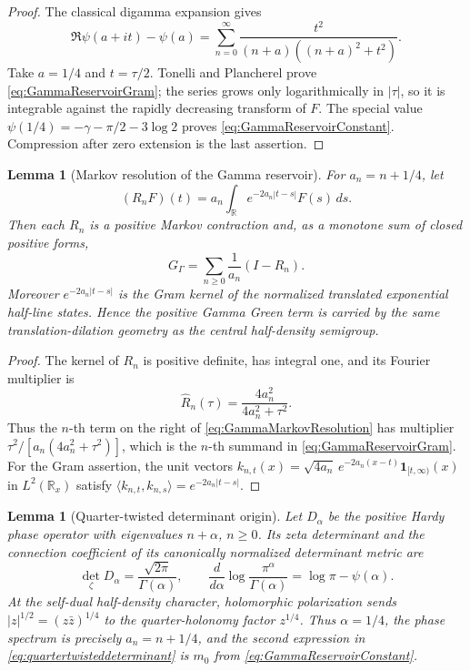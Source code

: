 \documentclass[11pt]{amsart}
\newtheorem{lemma}[theorem]{Lemma}
\theoremstyle{definition}
\theoremstyle{remark}
\begin{document}
\begin{proof}
The classical digamma expansion gives
\[
 \Re\psi(a+it)-\psi(a)
 =\sum_{n=0}^\infty
 \frac{t^2}{(n+a)((n+a)^2+t^2)}.
\]
Take $a=1/4$ and $t=\tau/2$.  Tonelli and Plancherel prove
\eqref{eq:GammaReservoirGram}; the series grows only logarithmically in
$|\tau|$, so it is integrable against the rapidly decreasing transform of
$F$.  The special value
$\psi(1/4)=-\gamma-\pi/2-3\log2$ proves
\eqref{eq:GammaReservoirConstant}.  Compression after zero extension is the
last assertion.
\end{proof}

\begin{lemma}[Markov resolution of the Gamma reservoir]
\label{lem:GammaMarkovResolution}
For $a_n=n+1/4$, let
\[
 (R_nF)(t)=a_n\int_{\mathbb R}e^{-2a_n|t-s|}F(s)\,ds.
\]
Then each $R_n$ is a positive Markov contraction and, as a monotone sum of
closed positive forms,
\begin{equation}\label{eq:GammaMarkovResolution}
 G_\Gamma=\sum_{n\ge0}\frac1{a_n}(I-R_n).
\end{equation}
Moreover $e^{-2a_n|t-s|}$ is the Gram kernel of the normalized translated
exponential half-line states.  Hence the positive Gamma Green term is carried
by the same translation-dilation geometry as the central half-density
semigroup.
\end{lemma}

\begin{proof}
The kernel of $R_n$ is positive definite, has integral one, and its Fourier
multiplier is
\[
 \widehat R_n(\tau)=\frac{4a_n^2}{4a_n^2+\tau^2}.
\]
Thus the $n$-th term on the right of
\eqref{eq:GammaMarkovResolution} has multiplier
\(\tau^2/[a_n(4a_n^2+\tau^2)]\), which is the $n$-th summand in
\eqref{eq:GammaReservoirGram}.  For the Gram assertion, the unit vectors
\(k_{n,t}(x)=\sqrt{4a_n}\,e^{-2a_n(x-t)}\mathbf1_{[t,\infty)}(x)\) in
\(L^2(\mathbb R_x)\) satisfy
\(\langle k_{n,t},k_{n,s}\rangle=e^{-2a_n|t-s|}\).
\end{proof}

\begin{lemma}[Quarter-twisted determinant origin]
\label{lem:quartertwisteddeterminant}
Let $D_\alpha$ be the positive Hardy phase operator with eigenvalues
$n+\alpha$, $n\ge0$.  Its zeta determinant and the connection coefficient
of its canonically normalized determinant metric are
\begin{equation}\label{eq:quartertwisteddeterminant}
 \det_\zeta D_\alpha=\frac{\sqrt{2\pi}}{\Gamma(\alpha)},
 \qquad
 \frac d{d\alpha}\log\frac{\pi^\alpha}{\Gamma(\alpha)}
 =\log\pi-\psi(\alpha).
\end{equation}
At the self-dual half-density character, holomorphic polarization sends
\(|z|^{1/2}=(z\bar z)^{1/4}\) to the quarter-holonomy factor
\(z^{1/4}\).  Thus \(\alpha=1/4\), the phase spectrum is precisely
\(a_n=n+1/4\), and the second expression in
\eqref{eq:quartertwisteddeterminant} is $m_0$ from
\eqref{eq:GammaReservoirConstant}.
\end{lemma}
\end{document}
